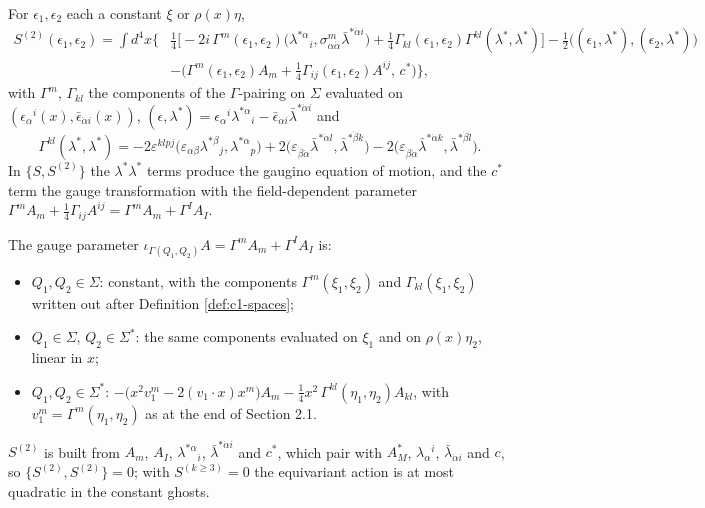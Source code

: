 \begin{remark}
For $\epsilon_1,\epsilon_2$ each a constant $\xi$ or $\rho(x)\eta$,
\[
\begin{aligned}
S^{(2)}(\epsilon_1,\epsilon_2)=\int d^4x\Big\{&\tfrac14\Big[-2i\,\Gamma^m(\epsilon_1,\epsilon_2)\big(\lambda^{*\alpha}{}_i,\sigma^m_{\alpha\dot\alpha}\bar\lambda^{*\dot\alpha i}\big)+\tfrac14\Gamma_{kl}(\epsilon_1,\epsilon_2)\Gamma^{kl}(\lambda^*,\lambda^*)\Big]-\tfrac12\big((\epsilon_1,\lambda^*),(\epsilon_2,\lambda^*)\big)\\
&-\big(\Gamma^m(\epsilon_1,\epsilon_2)A_m+\tfrac14\Gamma_{ij}(\epsilon_1,\epsilon_2)A^{ij},\,c^*\big)\Big\},
\end{aligned}
\]
with $\Gamma^m$, $\Gamma_{kl}$ the components of the $\Gamma$-pairing on $\Sigma$ evaluated on $(\epsilon_\alpha{}^i(x),\bar\epsilon_{\dot\alpha i}(x))$, $(\epsilon,\lambda^*)=\epsilon_\alpha{}^i\lambda^{*\alpha}{}_i-\bar\epsilon_{\dot\alpha i}\bar\lambda^{*\dot\alpha i}$ and
\[
\Gamma^{kl}(\lambda^*,\lambda^*)=-2\varepsilon^{klpj}\big(\varepsilon_{\alpha\beta}\lambda^{*\beta}{}_j,\lambda^{*\alpha}{}_p\big)+2\big(\varepsilon_{\dot\beta\dot\alpha}\bar\lambda^{*\dot\alpha l},\bar\lambda^{*\dot\beta k}\big)-2\big(\varepsilon_{\dot\beta\dot\alpha}\bar\lambda^{*\dot\alpha k},\bar\lambda^{*\dot\beta l}\big).
\]
In $\{S,S^{(2)}\}$ the $\lambda^*\lambda^*$ terms produce the gaugino equation of motion, and the $c^*$ term the gauge transformation with the field-dependent parameter $\Gamma^mA_m+\tfrac14\Gamma_{ij}A^{ij}=\Gamma^mA_m+\Gamma^IA_I$.
\end{remark}

\begin{remark}
The gauge parameter $\iota_{\Gamma(Q_1,Q_2)}A=\Gamma^mA_m+\Gamma^IA_I$ is:
\begin{itemize}
\item $Q_1,Q_2\in\Sigma$: constant, with the components $\Gamma^m(\xi_1,\xi_2)$ and $\Gamma_{kl}(\xi_1,\xi_2)$ written out after Definition \ref{def:c1-spaces};
\item $Q_1\in\Sigma$, $Q_2\in\Sigma^*$: the same components evaluated on $\xi_1$ and on $\rho(x)\eta_2$, linear in $x$;
\item $Q_1,Q_2\in\Sigma^*$: $-\big(x^2v_1^m-2(v_1\cdot x)x^m\big)A_m-\tfrac14x^2\,\Gamma^{kl}(\eta_1,\eta_2)A_{kl}$, with $v_1^m=\Gamma^m(\eta_1,\eta_2)$ as at the end of Section 2.1.
\end{itemize}
$S^{(2)}$ is built from $A_m$, $A_I$, $\lambda^{*\alpha}{}_i$, $\bar\lambda^{*\dot\alpha i}$ and $c^*$, which pair with $A^*_M$, $\lambda_\alpha{}^i$, $\bar\lambda_{\dot\alpha i}$ and $c$, so $\{S^{(2)},S^{(2)}\}=0$; with $S^{(k\ge3)}=0$ the equivariant action is at most quadratic in the constant ghosts.
\end{remark}

